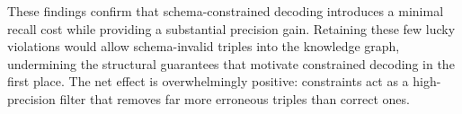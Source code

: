 These findings confirm that schema-constrained decoding introduces a minimal recall cost while providing a substantial precision gain.
Retaining these few lucky violations would allow schema-invalid triples into the knowledge graph, undermining the structural guarantees that motivate constrained decoding in the first place.
The net effect is overwhelmingly positive: constraints act as a high-precision filter that removes far more erroneous triples than correct ones.
